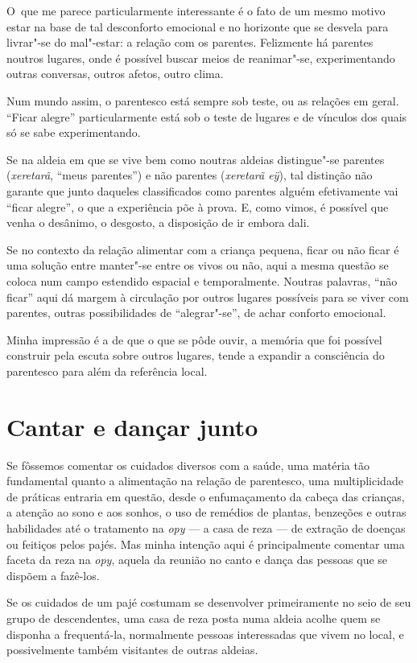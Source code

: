 O~que me parece particularmente interessante é o fato de um mesmo motivo
estar na base de tal desconforto emocional e no horizonte que se
desvela para livrar"-se do mal"-estar: a relação com os parentes.
Felizmente há parentes noutros lugares, onde é possível buscar meios de
reanimar"-se, experimentando outras conversas, outros afetos, outro
clima. 

Num mundo assim, o parentesco está sempre sob teste, ou as relações em
geral. ``Ficar alegre'' particularmente está sob o teste de lugares e de
vínculos dos quais só se sabe experimentando. 

Se na aldeia em que se vive bem como noutras aldeias distingue"-se
parentes (\emph{xeretarã}, ``meus parentes'') e não parentes (\emph{xeretarã eÿ}), tal
distinção não garante que junto daqueles classificados como parentes
alguém efetivamente vai ``ficar alegre'', o que a experiência põe à
prova. E, como vimos, é possível que venha o desânimo, o desgosto, a
disposição de ir embora dali.

Se no contexto da relação alimentar com a criança pequena, ficar ou não
ficar é uma solução entre manter"-se entre os vivos ou não, aqui a mesma
questão se coloca num campo estendido espacial e temporalmente. Noutras
palavras, ``não ficar'' aqui dá margem à circulação por outros lugares
possíveis para se viver com parentes, outras possibilidades de
``alegrar"-se'', de achar conforto emocional. 

Minha impressão é a de que o que se pôde ouvir, a memória que foi
possível construir pela escuta sobre outros lugares, tende a expandir a
consciência do parentesco para além da referência local. 

\section{Cantar e dançar junto}

Se fôssemos comentar os cuidados diversos com a saúde, uma matéria tão
fundamental quanto a alimentação na relação de parentesco, uma
multiplicidade de práticas entraria em questão, desde o enfumaçamento
da cabeça das crianças, a atenção ao sono e aos sonhos, o uso de
remédios de plantas, benzeções e outras habilidades até o tratamento na
\emph{opy} --- a casa de reza --- de extração de doenças ou feitiços pelos pajés.
Mas minha intenção aqui é principalmente comentar uma faceta da reza na
\emph{opy}, aquela da reunião no canto e dança das pessoas que se dispõem a
fazê-los.

Se os cuidados de um pajé costumam se desenvolver primeiramente no seio
de seu grupo de descendentes, uma casa de reza posta numa aldeia acolhe
quem se disponha a frequentá-la, normalmente pessoas interessadas que
vivem no local, e possivelmente também visitantes de outras aldeias.

